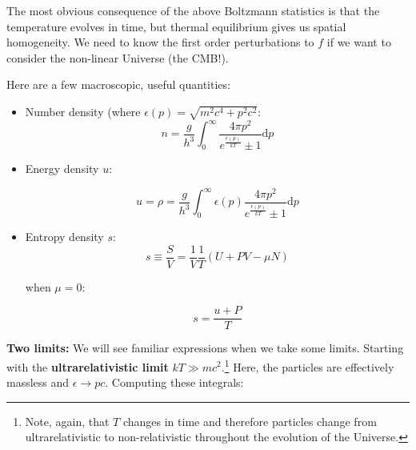 \documentclass{article}
\newcommand{\be}{\begin{equation}}
\newcommand{\ee}{\end{equation}}
\begin{document}
The most obvious consequence of the above Boltzmann statistics is that the temperature evolves in time, but thermal equilibrium gives us spatial homogeneity. We need to know the first order perturbations to $f$ if we want to consider the non-linear Universe (the CMB!). 

Here are a few macroscopic, useful quantities:

\begin{itemize}
    \item Number density (where $\epsilon(p) = \sqrt{m^2 c^4 + p^2 c^2}$: 
    \be
    n = \frac{g}{h^3} \int_{0}^{\infty} \frac{4\pi p^2 }{e^\frac{\epsilon(p)}{kT} \pm 1}\mathrm{d}p
    \ee
    
    \item Energy density $u$:
    
    \be
    u = \rho = \frac{g}{h^3} \int_{0}^{\infty} \epsilon(p) \frac{4\pi p^2 }{e^\frac{\epsilon(p)}{kT} \pm 1}\mathrm{d}p
    \ee
    
    \item Entropy density $s$:
    \be
    s \equiv \frac{S}{V} = \frac{1}{V}\frac{1}{T} \left(U + PV - \mu N\right)
    \ee
    
    when $\mu = 0$:
    
    \be
    s = \frac{u+P}{T} 
    \ee
\end{itemize}


\noindent\textbf{Two limits:}
We will see familiar expressions when we take some limits. Starting with the \textbf{ultrarelativistic limit} $kT \gg mc^2$.\footnote{Note, again, that $T$ changes in time and therefore particles change from ultrarelativistic to non-relativistic throughout the evolution of the Universe. } Here, the particles are effectively massless and $\epsilon \rightarrow pc$. Computing these integrals:
\end{document}
